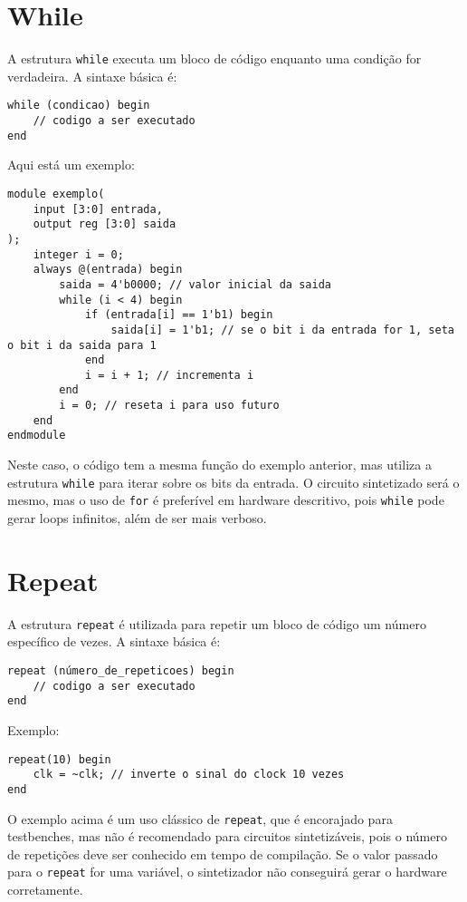 \documentclass{article}
\begin{document}
\section*{While}

A estrutura \texttt{while} executa um bloco de código enquanto uma condição for verdadeira. A sintaxe básica é:

\begin{lstlisting}
while (condicao) begin
    // codigo a ser executado
end
\end{lstlisting}

Aqui está um exemplo:

\begin{lstlisting}
module exemplo(
    input [3:0] entrada,
    output reg [3:0] saida
);
    integer i = 0;
    always @(entrada) begin
        saida = 4'b0000; // valor inicial da saida
        while (i < 4) begin
            if (entrada[i] == 1'b1) begin
                saida[i] = 1'b1; // se o bit i da entrada for 1, seta o bit i da saida para 1
            end
            i = i + 1; // incrementa i
        end
        i = 0; // reseta i para uso futuro
    end
endmodule
\end{lstlisting}

Neste caso, o código tem a mesma função do exemplo anterior, mas utiliza a estrutura \texttt{while} para iterar sobre os bits da entrada. O circuito sintetizado será o mesmo, mas o uso de \texttt{for} é preferível em hardware descritivo, pois \texttt{while} pode gerar loops infinitos, além de ser mais verboso.

\section*{Repeat}

A estrutura \texttt{repeat} é utilizada para repetir um bloco de código um número específico de vezes. A sintaxe básica é:

\begin{lstlisting}
repeat (número_de_repeticoes) begin
    // codigo a ser executado
end
\end{lstlisting}

Exemplo:

\begin{lstlisting}
repeat(10) begin
    clk = ~clk; // inverte o sinal do clock 10 vezes
end
\end{lstlisting}

O exemplo acima é um uso clássico de \texttt{repeat}, que é encorajado para testbenches, mas não é recomendado para circuitos sintetizáveis, pois o número de repetições deve ser conhecido em tempo de compilação. Se o valor passado para o \texttt{repeat} for uma variável, o sintetizador não conseguirá gerar o hardware corretamente.
\end{document}
